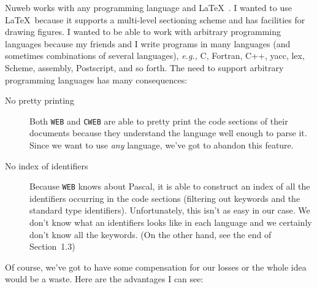 Nuweb works with any programming language and \LaTeX~\cite{latex}. I
wanted to use \LaTeX\ because it supports a multi-level sectioning
scheme and has facilities for drawing figures. I wanted to be able to
work with arbitrary programming languages because my friends and I
write programs in many languages (and sometimes combinations of
several languages), {\em e.g.,} C, Fortran, C++, yacc, lex, Scheme,
assembly, Postscript, and so forth. The need to support arbitrary
programming languages has many consequences:
\begin{description}
\item[No pretty printing] Both \verb|WEB| and \verb|CWEB| are able to
  pretty print the code sections of their documents because they
  understand the language well enough to parse it. Since we want to use
  {\em any\/} language, we've got to abandon this feature.
\item[No index of identifiers] Because \verb|WEB| knows about Pascal,
  it is able to construct an index of all the identifiers occurring in
  the code sections (filtering out keywords and the standard type
  identifiers). Unfortunately, this isn't as easy in our case. We don't
  know what an identifiers looks like in each language and we certainly
  don't know all the keywords. (On the other hand, see the end of
  Section~1.3)
\end{description}
Of course, we've got to have some compensation for our losses or the
whole idea would be a waste. Here are the advantages I can see:
